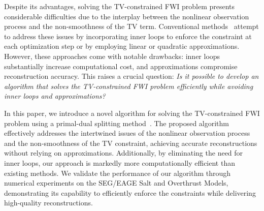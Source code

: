 Despite its advantages, solving the TV-constrained FWI problem presents considerable difficulties due to the interplay between the nonlinear observation process and the non-smoothness of the TV term.
Conventional methods~\mbox{\cite{FWI-with-TV-constraint,FWI-with-TV-constraint2,FWI-with-TV-constraint3,FWI-with-TV-constraint4}} attempt to address these issues by incorporating inner loops to enforce the constraint at each optimization step or by employing linear or quadratic approximations.
However, these approaches come with notable drawbacks: inner loops substantially increase computational cost, and approximations compromise reconstruction accuracy.
This raises a crucial question: \textit{Is it possible to develop an algorithm that solves the TV-constrained FWI problem efficiently while avoiding inner loops and approximations?}

In this paper, we introduce a novel algorithm for solving the TV-constrained FWI problem using a primal-dual splitting method~\cite{PDS2}.
The proposed algorithm effectively addresses the intertwined issues of the nonlinear observation process and the non-smoothness of the TV constraint, achieving accurate reconstructions without relying on approximations.
Additionally, by eliminating the need for inner loops, our approach is markedly more computationally efficient than existing methods.
We validate the performance of our algorithm through numerical experiments on the SEG/EAGE Salt and Overthrust Models, demonstrating its capability to efficiently enforce the constraints while delivering high-quality reconstructions.

